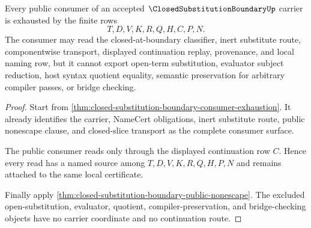 \begin{theorem}
\label{thm:closed-substitution-boundary-public-consumer-surface}
Every public consumer of an accepted $\ClosedSubstitutionBoundaryUp$ carrier is exhausted by the finite rows
$$
T,D,V,K,R,Q,H,C,P,N .
$$
The consumer may read the closed-at-boundary classifier, inert substitute route, componentwise transport, displayed continuation replay, provenance, and local naming row, but it cannot export open-term substitution, evaluator subject reduction, host syntax quotient equality, semantic preservation for arbitrary compiler passes, or bridge checking.
\end{theorem}
\begin{proof}
Start from \autoref{thm:closed-substitution-boundary-consumer-exhaustion}. It already identifies the carrier, NameCert obligations, inert substitute route, public nonescape clause, and closed-slice transport as the complete consumer surface.

The public consumer reads only through the displayed continuation row $C$. Hence every read has a named source among $T,D,V,K,R,Q,H,P,N$ and remains attached to the same local certificate.

Finally apply \autoref{thm:closed-substitution-boundary-public-nonescape}. The excluded open-substitution, evaluator, quotient, compiler-preservation, and bridge-checking objects have no carrier coordinate and no continuation route.
\end{proof}


